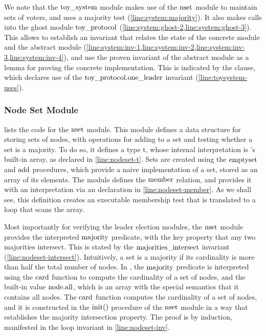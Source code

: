 We note that the ${\text{toy\_system}}$ module makes use of the ${\text{nset}}$
module to maintain sets of voters, and uses a majority test
(\cref{line:system:majority}). It also makes calls into the ghost
module ${\text{toy\_protocol}}$
(\cref{line:system:ghost-2,line:system:ghost-3}). This allows to
establish an invariant that relates the state of the concrete module
and the abstract module
(\cref{line:system:inv-1,line:system:inv-2,line:system:inv-3,line:system:inv-4}),
and use the proven invariant of the abstract module as a lemma for
proving the concrete implementation. This is indicated by the
 clause, which declares use of the
${\text{toy\_protocol}}.{\text{one\_leader}}$ invariant (\cref{line:toysystem-uses}).

\subsubsection{Node Set Module}
\label{sec:nodeset}




 lists the code for the ${\text{nset}}$ module. This
module defines a data structure for storing sets of nodes, with
operations for adding to a set and testing whether a set is a
majority. To do so, it defines a type t, whose internal interpretation is \Lang's
built-in array, as declared in \cref{line:nodeset-t}.
Sets are created using the ${\text{emptyset}}$ and ${\text{add}}$ procedures, which
provide a naive implementation of a set, stored as an array of its
elements.  The module defines the ${\text{member}}$ relation, and provides it
with an interpretation via an  declaration in
\cref{line:nodeset-member}. As we shall see, this definition creates
an executable membership test that is translated to a loop that scans
the array.

Most importantly for verifying the leader election modules, the
${\text{nset}}$ module provides the interpreted ${\text{majority}}$ predicate,
with the key property that any two majorities intersect. This is
stated by the ${\text{majorities\_intersect}}$ invariant (\cref{line:nodeset-intersect}).
Intuitively, a set is a majority if its cardinality is more than half
the total number of nodes.  In , the ${\text{majority}}$
predicate is interpreted using the ${\text{card}}$ function to compute the
cardinality of a set of nodes, and the built-in value ${\text{node}}.{\text{all}}$,
which is an array with the special semantics that it contains all
nodes.  The ${\text{card}}$ function computes the cardinality of a set of
nodes, and it is constructed in the ${\text{init}}()$ procedure of the
${\text{nset}}$ module in a way that establishes the majority intersection
property. The proof is by induction, manifested in the loop invariant
in \cref{line:nodeset-inv}.

